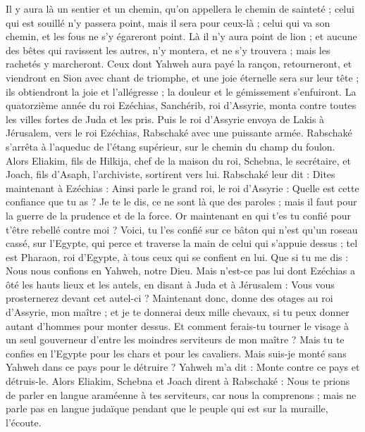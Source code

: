 \begin{multicols}{2}
Il y aura là un sentier et un chemin, qu'on appellera le chemin de sainteté ; celui qui est souillé n'y passera point, mais il sera pour ceux-là ; celui qui va son chemin, et les fous ne s'y égareront point.
Là il n'y aura point de lion ; et aucune des bêtes qui ravissent les autres, n'y montera, et ne s'y trouvera ; mais les rachetés y marcheront.
Ceux dont Yahweh aura payé la rançon, retourneront, et viendront en Sion avec chant de triomphe, et une joie éternelle sera sur leur tête ; ils obtiendront la joie et l'allégresse ; la douleur et le gémissement s'enfuiront.
\VerseOne{}La quatorzième année du roi Ezéchias, Sanchérib, roi d'Assyrie, monta contre toutes les villes fortes de Juda et les pris.
Puis le roi d'Assyrie envoya de Lakis à Jérusalem, vers le roi Ezéchias, Rabschaké avec une puissante armée. Rabschaké s'arrêta à l'aqueduc de l'étang supérieur, sur le chemin du champ du foulon.
Alors Eliakim, fils de Hilkija, chef de la maison du roi, Schebna, le secrétaire, et Joach, fils d'Asaph, l'archiviste, sortirent vers lui.
Rabschaké leur dit : Dites maintenant à Ezéchias : Ainsi parle le grand roi, le roi d'Assyrie : Quelle est cette confiance que tu as ?
Je te le dis, ce ne sont là que des paroles ; mais il faut pour la guerre de la prudence et de la force. Or maintenant en qui t'es tu confié pour t'être rebellé contre moi ?
Voici, tu l'es confié sur ce bâton qui n'est qu'un roseau cassé, sur l'Egypte, qui perce et traverse la main de celui qui s'appuie dessus ; tel est Pharaon, roi d'Egypte, à tous ceux qui se confient en lui.
Que si tu me dis : Nous nous confions en Yahweh, notre Dieu. Mais n'est-ce pas lui dont Ezéchias a ôté les hauts lieux et les autels, en disant à Juda et à Jérusalem : Vous vous prosternerez devant cet autel-ci ?
Maintenant donc, donne des otages au roi d'Assyrie, mon maître ; et je te donnerai deux mille chevaux, si tu peux donner autant d'hommes pour monter dessus.
Et comment ferais-tu tourner le visage à un seul gouverneur d'entre les moindres serviteurs de mon maître ? Mais tu te confies en l'Egypte pour les chars et pour les cavaliers.
Mais suis-je monté sans Yahweh dans ce pays pour le détruire ? Yahweh m'a dit : Monte contre ce pays et détruis-le.
Alors Eliakim, Schebna et Joach dirent à Rabschaké : Nous te prions de parler en langue araméenne à tes serviteurs, car nous la comprenons ; mais ne parle pas en langue judaïque pendant que le peuple qui est sur la muraille, l'écoute.

\end{multicols}
